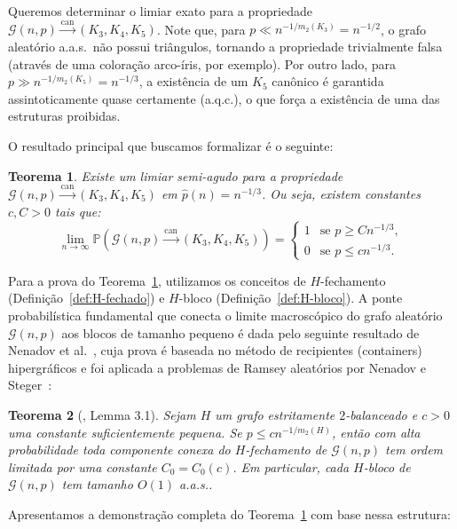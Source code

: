 \documentclass[reqno, 12pt]{amsart}
\numberwithin{equation}{section}
\theoremstyle{plain}
\newtheorem{theorem}{Teorema}[section]
\theoremstyle{definition}
\newcommand{\Gnp}{\mathcal{G}(n,p)}
\newcommand{\mdens}{m_2}
\newcommand{\whp}{a.a.s.}
\begin{document}
Queremos determinar o limiar exato para a propriedade $\Gnp \xrightarrow{\mathrm{can}} (K_3,K_4,K_5)$.
Note que, para $p \ll n^{-1/\mdens(K_3)} = n^{-1/2}$, o grafo aleatório \whp\ não possui triângulos, tornando a propriedade trivialmente falsa (através de uma coloração arco-íris, por exemplo).
Por outro lado, para $p \gg n^{-1/\mdens(K_5)} = n^{-1/3}$, a existência de um $K_5$ canônico é garantida assintoticamente quase certamente (a.q.c.), o que força a existência de uma das estruturas proibidas.

O resultado principal que buscamos formalizar é o seguinte:

\begin{theorem}
    \label{thm:main-can}
    Existe um limiar semi-agudo para a propriedade $\Gnp \xrightarrow{\mathrm{can}} (K_3,K_4,K_5)$ em $\hat{p}(n) = n^{-1/3}$. Ou seja, existem constantes $c, C > 0$ tais que:
    \[
        \lim_{n \to \infty} \mathbb{P}(\Gnp \xrightarrow{\mathrm{can}} (K_3,K_4,K_5)) =
        \begin{cases}
            1 & \text{se } p \ge C n^{-1/3}, \\
            0 & \text{se } p \le c n^{-1/3}.
        \end{cases}
    \]
\end{theorem}

Para a prova do Teorema~\ref{thm:main-can}, utilizamos os conceitos de $H$-fechamento (Definição~\ref{def:H-fechado}) e $H$-bloco (Definição~\ref{def:H-bloco}). A ponte probabilística fundamental que conecta o limite macroscópico do grafo aleatório $\Gnp$ aos blocos de tamanho pequeno é dada pelo seguinte resultado de Nenadov et al.~\cite{nenadov2017algorithmic}, cuja prova é baseada no método de recipientes (containers) hipergráficos e foi aplicada a problemas de Ramsey aleatórios por Nenadov e Steger~\cite{nenadov2016short}:

\begin{theorem}[\cite{nenadov2017algorithmic}, Lemma 3.1]
    \label{thm:nenadov-steger}
    Sejam $H$ um grafo estritamente $2$-balanceado e $c > 0$ uma constante suficientemente pequena. Se $p \le c n^{-1/m_2(H)}$, então com alta probabilidade toda componente conexa do $H$-fechamento de $\Gnp$ tem ordem limitada por uma constante $C_0 = C_0(c)$. Em particular, cada $H$-bloco de $\Gnp$ tem tamanho $O(1)$ \whp.
\end{theorem}

Apresentamos a demonstração completa do Teorema~\ref{thm:main-can} com base nessa estrutura:
\end{document}
